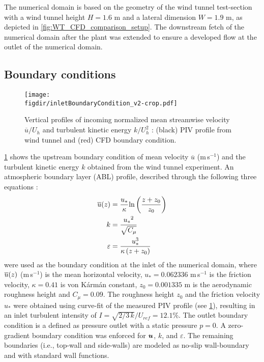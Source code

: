 The numerical domain is based on the geometry of the wind tunnel test-section with a wind tunnel height $H=1.6$ m and a lateral dimension $W=1.9$ m, as depicted in \cref{fig:WT_CFD_comparison_setup}. The downstream fetch of the numerical domain after the plant was extended to ensure a developed flow at the outlet of the numerical domain. %

\subsection{Boundary conditions}

\begin{figure}[t]
	\centering
	\texttt{[image: \\figdir/inletBoundaryCondition\_v2-crop.pdf]}
	\caption{Vertical profiles of incoming normalized  mean streamwise velocity $\overline{u}/U_h$ and   turbulent kinetic energy $k/U_h^2$ : (black) PIV profile from wind tunnel and (red) CFD boundary condition.}
	\label{fig:boundaryprofile}
\end{figure}

\cref{fig:boundaryprofile} shows the upstream boundary condition of mean velocity $\overline{u}$ (m\,s$^{-1}$) and the turbulent kinetic energy $k$ obtained from the wind tunnel experiment. An atmospheric boundary layer (ABL) profile, described through the following three equations \citep{Richards1993}:
\begin{align}
	\overline{u}(z) &= \frac{{{u_*}}}{\kappa }{\text{ln}}\left( {\frac{{z + {z_0}}}{{{z_0}}}} \right) \\
	k &= \frac{{{u_*}^2}}{{\sqrt {{C_\mu }} }} \\
	\varepsilon  &= \frac{{u_*^3}}{{\kappa \left( {z + {z_0}} \right)}}
	\label{eq:ableq}
\end{align}
were used as the boundary condition at the inlet of the numerical domain, where $\overline{u}(z)$ (m\,s$^{-1}$) is the mean horizontal velocity, $u_*= \num{0.062336}$ m\,s$^{-1}$ is  the friction velocity, $\kappa=0.41$ is von K\'arm\'an constant, $z_0 = \num{0.001335}$ m is the aerodynamic roughness height and $C_{\mu}=0.09$. The roughness height $z_0$ and the friction velocity $u_*$ were obtained using curve-fit of the measured PIV profile (see \cref{fig:boundaryprofile}), resulting in an inlet turbulent intensity of $I = \sqrt{2/3\,k}/U_{ref} = 12.1 \%$. The outlet boundary condition is a defined as pressure outlet with a static pressure $p=0$. A zero-gradient boundary condition was enforced for $\textbf{\textit{u}}$, $k$, and $\varepsilon$. The remaining boundaries (i.e., top-wall and side-walls) are modeled as no-slip wall-boundary and with standard wall functions.

